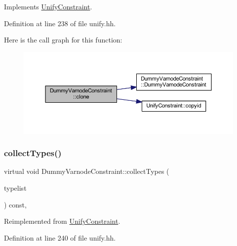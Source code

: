 Implements \mbox{\hyperlink{class_unify_constraint_a4f068343932637d355644bb21559aa12}{Unify\+Constraint}}.



Definition at line 238 of file unify.\+hh.

Here is the call graph for this function\+:
\nopagebreak
\begin{figure}[H]
\begin{center}
\leavevmode
\includegraphics[width=350pt]{class_dummy_varnode_constraint_a8a5c0d0f00ab7343a19985465e59dc4b_cgraph}
\end{center}
\end{figure}
\mbox{\label{class_dummy_varnode_constraint_a93602f80ea23d51b74250700aab3e991}} 
\subsubsection{\texorpdfstring{collectTypes()}{collectTypes()}}
{\footnotesize\ttfamily virtual void Dummy\+Varnode\+Constraint\+::collect\+Types (\begin{DoxyParamCaption}\item[{vector$<$ \mbox{\hyperlink{class_unify_datatype}{Unify\+Datatype}} $>$ \&}]{typelist }\end{DoxyParamCaption}) const\hspace{0.3cm}{\ttfamily [inline]}, {\ttfamily [virtual]}}



Reimplemented from \mbox{\hyperlink{class_unify_constraint_acb83b6bea3b21e13054e72ac9cfaba0f}{Unify\+Constraint}}.



Definition at line 240 of file unify.\+hh.

\mbox{\label{class_dummy_varnode_constraint_ae4492ac6a373dc86f3d92fc8ba314f70}} 
